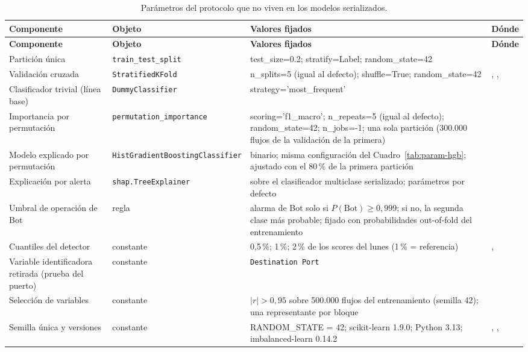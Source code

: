 \begin{longtable}{L{2.9cm} L{3.5cm} L{4.3cm} L{3.2cm}}
\caption{Parámetros del protocolo que no viven en los modelos serializados.}\label{tab:param-protocolo}\\
\toprule
\textbf{Componente} & \textbf{Objeto} & \textbf{Valores fijados} & \textbf{Dónde} \\
\midrule
\endfirsthead
\toprule
\textbf{Componente} & \textbf{Objeto} & \textbf{Valores fijados} & \textbf{Dónde} \\
\midrule
\endhead
\bottomrule
\endfoot
Partición única & \texttt{train\_test\_split} & test\_size=0.2; stratify=Label; random\_state=42 &  \\
Validación cruzada & \texttt{StratifiedKFold} & n\_splits=5 (igual al defecto); shuffle=True; random\_state=42 & , ,  \\
Clasificador trivial (línea base) & \texttt{DummyClassifier} & strategy='most\_frequent' &  \\
Importancia por permutación & \texttt{permutation\_\allowbreak importance} & scoring='f1\_macro'; n\_repeats=5 (igual al defecto); random\_state=42; n\_jobs=-1; una sola partición (300.000 flujos de la validación de la primera) &  \\
Modelo explicado por permutación & \texttt{HistGradient\allowbreak Boosting\allowbreak Classifier} & binario; misma configuración del Cuadro~\ref{tab:param-hgb}; ajustado con el 80\,\% de la primera partición &  \\
Explicación por alerta & \texttt{shap.TreeExplainer} & sobre el clasificador multiclase serializado; parámetros por defecto &  \\
Umbral de operación de Bot & regla & alarma de Bot solo si $P(\mathrm{Bot}) \geq 0{,}999$; si no, la segunda clase más probable; fijado con probabilidades out-of-fold del entrenamiento &  \\
Cuantiles del detector & constante & 0{,}5\,\%; 1\,\%; 2\,\% de los scores del lunes (1\,\% = referencia) & ,  \\
Variable identificadora retirada (prueba del puerto) & constante & \texttt{Destination Port} &  \\
Selección de variables & constante & $|r| > 0{,}95$ sobre 500.000 flujos del entrenamiento (semilla 42); una representante por bloque &  \\
Semilla única y versiones & constante & RANDOM\_STATE = 42; scikit-learn 1.9.0; Python 3.13; imbalanced-learn 0.14.2 & , ,  \\
\end{longtable}
